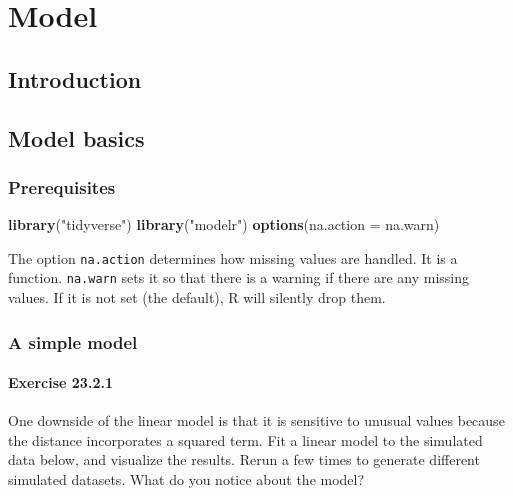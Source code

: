 \documentclass[]{book}
\newenvironment{Shaded}{\begin{snugshade}}{\end{snugshade}}
\newcommand{\DataTypeTok}[1]{\textcolor[rgb]{0.13,0.29,0.53}{#1}}
\newcommand{\KeywordTok}[1]{\textcolor[rgb]{0.13,0.29,0.53}{\textbf{#1}}}
\newcommand{\NormalTok}[1]{#1}
\newcommand{\StringTok}[1]{\textcolor[rgb]{0.31,0.60,0.02}{#1}}
\theoremstyle{plain}
\theoremstyle{remark}
\theoremstyle{definition}
\theoremstyle{definition}
\theoremstyle{definition}
\theoremstyle{remark}
\begin{document}
\hypertarget{part-model}{%
\part{Model}\label{part-model}}

\hypertarget{model-intro}{%
\chapter{Introduction}\label{model-intro}}

\hypertarget{model-basics}{%
\chapter{Model basics}\label{model-basics}}

\hypertarget{prerequisites-1}{%
\section{Prerequisites}\label{prerequisites-1}}

\begin{Shaded}
\begin{Highlighting}[]
\KeywordTok{library}\NormalTok{(}\StringTok{"tidyverse"}\NormalTok{)}
\KeywordTok{library}\NormalTok{(}\StringTok{"modelr"}\NormalTok{)}
\KeywordTok{options}\NormalTok{(}\DataTypeTok{na.action =}\NormalTok{ na.warn)}
\end{Highlighting}
\end{Shaded}

The option \texttt{na.action} determines how missing values are handled.
It is a function. \texttt{na.warn} sets it so that there is a warning if
there are any missing values. If it is not set (the default), R will
silently drop them.

\hypertarget{a-simple-model}{%
\section{A simple model}\label{a-simple-model}}

\hypertarget{exercise-23.2.1}{%
\subsection*{\texorpdfstring{Exercise
{23.2.1}}{Exercise 23.2.1}}\label{exercise-23.2.1}}

One downside of the linear model is that it is sensitive to unusual
values because the distance incorporates a squared term. Fit a linear
model to the simulated data below, and visualize the results. Rerun a
few times to generate different simulated datasets. What do you notice
about the model?
\end{document}
